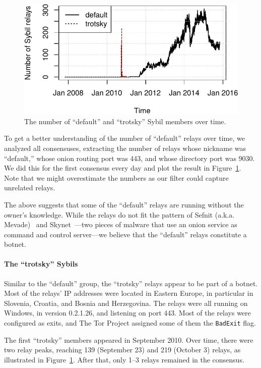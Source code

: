 \begin{figure}[t]
	\centering
	\includegraphics[width=\linewidth]{diagrams/default-over-time}
	\caption{The number of ``default'' and ``trotsky'' Sybil members over time.}
	\label{fig:default-over-time}
\end{figure}

To get a better understanding of the number of ``default'' relays over time, we
analyzed all consensuses, extracting the number of relays whose nickname was
``default,'' whose onion routing port was 443, and whose directory port was
9030.  We did this for the first consensus every day and plot the result in
Figure~\ref{fig:default-over-time}.  Note that we might overestimate the numbers
as our filter could capture unrelated relays.

The above suggests that some of the ``default'' relays are running without the
owner's knowledge.  While the relays do not fit the pattern of Sefnit (a.k.a.
Mevade)~\cite{sefnit} and Skynet~\cite{skynet}---two pieces of malware that use
an onion service as command and control server---we believe that the ``default''
relays constitute a botnet.

\paragraph{The ``trotsky'' Sybils}
Similar to the ``default'' group, the ``trotsky'' relays appear to be part of
a botnet.  Most of the relays' IP addresses were located in Eastern Europe, in
particular in Slovenia, Croatia, and Bosnia and Herzegovina.  The relays were
all running on Windows, in version 0.2.1.26, and listening on port 443.  Most of
the relays were configured as exits, and The Tor Project assigned some of them
the \texttt{BadExit} flag.

The first ``trotsky'' members appeared in September 2010.  Over time, there were
two relay peaks, reaching 139 (September 23) and 219 (October 3) relays, as
illustrated in Figure~\ref{fig:default-over-time}.  After that, only 1--3 relays
remained in the consensus.

